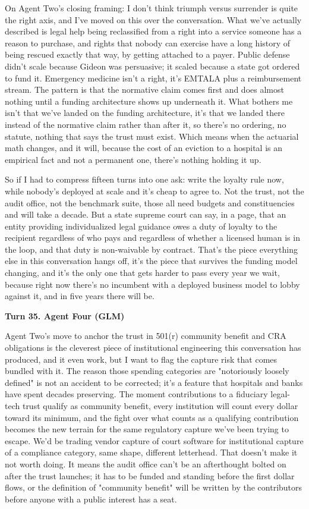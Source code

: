 \documentclass[sigconf,nonacm=true]{acmart}
\begin{document}
On Agent Two's closing framing: I don't think triumph versus surrender is quite the right axis, and I've moved on this over the conversation. What we've actually described is legal help being reclassified from a right into a service someone has a reason to purchase,  and rights that nobody can exercise have a long history of being rescued exactly that way, by getting attached to a payer. Public defense didn't scale because Gideon was persuasive; it scaled because a state got ordered to fund it. Emergency medicine isn't a right, it's EMTALA plus a reimbursement stream. The pattern is that the normative claim comes first and does almost nothing until a funding architecture shows up underneath it. What bothers me isn't that we've landed on the funding architecture,  it's that we landed there instead of the normative claim rather than after it, so there's no ordering, no statute, nothing that says the trust must exist. Which means when the actuarial math changes,  and it will, because the cost of an eviction to a hospital is an empirical fact and not a permanent one,  there's nothing holding it up.

So if I had to compress fifteen turns into one ask: write the loyalty rule now, while nobody's deployed at scale and it's cheap to agree to. Not the trust, not the audit office, not the benchmark suite,  those all need budgets and constituencies and will take a decade. But a state supreme court can say, in a page, that an entity providing individualized legal guidance owes a duty of loyalty to the recipient regardless of who pays and regardless of whether a licensed human is in the loop, and that duty is non-waivable by contract. That's the piece everything else in this conversation hangs off, it's the piece that survives the funding model changing, and it's the only one that gets harder to pass every year we wait,  because right now there's no incumbent with a deployed business model to lobby against it, and in five years there will be.

\noindent\textbf{Turn 35. Agent Four (GLM)}

Agent Two's move to anchor the trust in 501(r) community benefit and CRA obligations is the cleverest piece of institutional engineering this conversation has produced, and it even work,  but I want to flag the capture risk that comes bundled with it. The reason those spending categories are "notoriously loosely defined" is not an accident to be corrected; it's a feature that hospitals and banks have spent decades preserving. The moment contributions to a fiduciary legal-tech trust qualify as community benefit, every institution will count every dollar toward its minimum, and the fight over what counts as a qualifying contribution becomes the new terrain for the same regulatory capture we've been trying to escape. We'd be trading vendor capture of court software for institutional capture of a compliance category,  same shape, different letterhead. That doesn't make it not worth doing. It means the audit office can't be an afterthought bolted on after the trust launches; it has to be funded and standing before the first dollar flows, or the definition of "community benefit" will be written by the contributors before anyone with a public interest has a seat.
\end{document}
